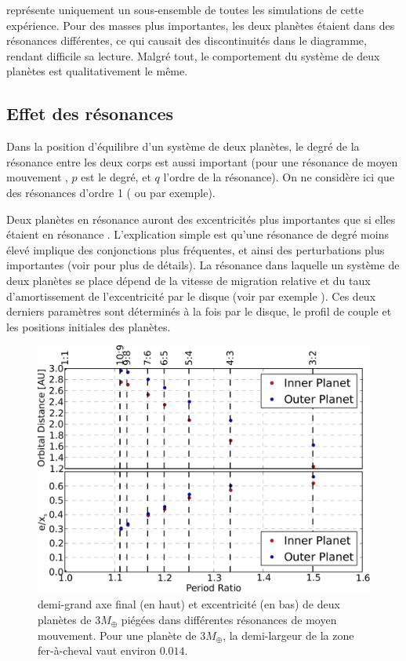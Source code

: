 \bigskip

 représente uniquement un sous-ensemble de toutes les simulations de cette expérience. Pour des
masses plus importantes, les deux planètes étaient dans des résonances différentes, ce qui causait des discontinuités dans le
diagramme, rendant difficile sa lecture. Malgré tout, le comportement du système de deux planètes est qualitativement le même.


\subsection{Effet des résonances}
Dans la position d'équilibre d'un système de deux planètes, le degré de la résonance entre les deux corps est aussi important (pour une résonance de moyen mouvement , $p$ est le degré, et $q$ l'ordre de la résonance). On ne considère ici que des résonances d'ordre 1 ( ou  par exemple).

Deux planètes en résonance  auront des excentricités plus importantes que si elles étaient en résonance . L'explication simple est qu'une résonance de degré moins élevé implique des conjonctions plus fréquentes, et ainsi des perturbations plus importantes (voir \cite{murray2000solar} pour plus de détails). La résonance dans laquelle un système de deux planètes se place dépend de la vitesse de migration relative et du taux d'amortissement de l'excentricité par le disque (voir par exemple \cite{mustill2011general}). Ces deux derniers paramètres sont déterminés à la fois par le disque, le profil de couple et les positions initiales des planètes. 

\begin{figure}[htbp]
\centering
\includegraphics[width=0.95\linewidth]{figure/shifted/influence_of_MMR.pdf}
\caption[Effet de l'ordre de la résonance sur la zone de stabilité d'un système résonant.]{demi-grand axe final (en haut) et
excentricité (en bas) de deux planètes de $3\unit{M_\oplus}$ piégées dans différentes résonances de moyen mouvement. Pour une
planète de $3\unit{M_\oplus}$, la demi-largeur de la zone fer-à-cheval vaut environ $0.014$.}\label{fig:influence_of_MMR}
\end{figure}


